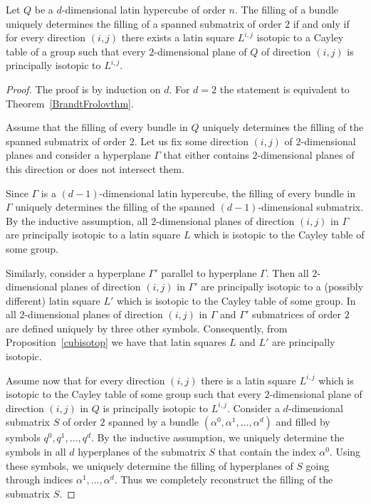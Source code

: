 \documentclass[a4paper]{article}
\begin{document}
\begin{theorem} \label{uniqrestor}
Let $Q$ be a $d$-dimensional latin hypercube of order $n$.  The   filling of a bundle uniquely determines the filling   of a spanned submatrix of order $2$ if and only if  for every direction $(i,j)$ there exists  a latin square $L^{i,j}$ isotopic to a Cayley table of a group  such that  every $2$-dimensional plane of $Q$ of direction $(i,j)$ is principally isotopic to $L^{i,j}$. 
\end{theorem}

\begin{proof}
The proof is by induction on $d$. For $d = 2$ the statement is equivalent to Theorem~\ref{BrandtFrolovthm}. 

Assume   that  the filling of  every  bundle  in $Q$  uniquely determines the filling   of the spanned submatrix  of order $2$. Let us fix some direction $(i,j)$ of $2$-dimensional planes and consider a  hyperplane $\Gamma$  that either contains $2$-dimensional planes of this direction or does not intersect them. 

Since  $\Gamma$ is a $(d-1)$-dimensional latin hypercube, the filling of  every  bundle  in  $\Gamma$  uniquely determines the filling   of the spanned $(d-1)$-dimensional submatrix.    By the inductive assumption,  all  $2$-dimensional planes of direction $(i,j)$ in $\Gamma$ are principally isotopic to a latin square $L$ which is isotopic to the Cayley table of some group. 

Similarly, consider a hyperplane $\Gamma'$ parallel to hyperplane $\Gamma$.  Then all  $2$-dimensional planes of direction $(i,j)$ in $\Gamma'$ are principally isotopic to a (possibly different) latin square $L'$ which is isotopic to the Cayley table of some group.  In all  $2$-dimensional planes of direction $(i,j)$ in $\Gamma$ and $\Gamma'$   submatrices of order $2$  are defined uniquely  by three other symbols. Consequently, from  Proposition~\ref{cubisotop} we have  that  latin squares $L$ and $L'$ are principally isotopic. 

Assume now that  for every direction $(i,j)$ there is  a latin square $L^{i,j}$ which is isotopic to the Cayley table of some group such that every $2$-dimensional plane of direction $(i,j)$   in $Q$ is principally isotopic to  $L^{i,j}$. Consider a $d$-dimensional submatrix $S$ of order $2$  spanned  by a bundle  $(\alpha^0, \alpha^1, \ldots, \alpha^d)$ and  filled by symbols $q^0,  q^1, \ldots, q^d $.  By the inductive assumption, we uniquely determine the symbols  in  all $d$ hyperplanes of the submatrix $S$ that contain the index $\alpha^0$.  Using these symbols, we uniquely determine the filling of hyperplanes of $S$ going through indices $\alpha^1, \ldots, \alpha^d$. Thus we completely reconstruct the filling of the submatrix $S$.
\end{proof}
\end{document}
